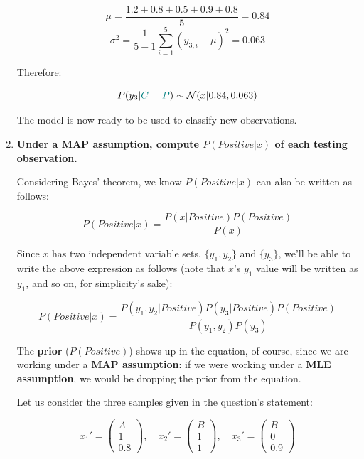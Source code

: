 \documentclass[12pt]{article}
\begin{document}
\begin{enumerate}[leftmargin=\labelsep]
\begin{multicols}{2}
          $$
            \mu = \frac{1.2 + 0.8 + 0.5 + 0.9 + 0.8}{5} = 0.84
          $$
          $$
            \sigma^2 = \frac{1}{5 - 1} \sum_{i = 1}^5 (y_{3, i} - \mu)^2 = 0.063
          $$

          Therefore:

          \vspace{-0.6cm}

          $$
            P(y_3 | \textcolor{teal}{C = P}) \sim \mathcal{N}(x | 0.84, 0.063)
          $$

        \end{multicols}

        The model is now ready to be used to classify new observations.

        \pagebreak

  \item \textbf{Under a MAP assumption, compute $P(Positive | x)$ of each testing observation.}

        Considering Bayes' theorem, we know $P(Positive | x)$ can also be written as follows:

        $$
          P(Positive | x) = \frac{P(x | Positive) P(Positive)}{P(x)}
        $$

        Since $x$ has two independent variable sets, $\{y_1, y_2\}$ and $\{y_3\}$, we'll be
        able to write the above expression as follows (note that $x$'s $y_1$ value will
        be written as $y_1$, and so on, for simplicity's sake):

        $$
          P(Positive | x) = \frac{P(y_1, y_2 | Positive) P(y_3 | Positive) P(Positive)}{P(y_1, y_2) P(y_3)}
        $$

        The \textbf{prior} ($P(Positive)$) shows up in the equation, of course, since
        we are working under a \textbf{MAP assumption}: if we were working under
        a \textbf{MLE assumption}, we would be dropping the prior from the equation.

        Let us consider the three samples given in the question's statement:

        $$
          x_1' = \begin{pmatrix}
            A \\
            1 \\
            0.8
          \end{pmatrix}, \quad
          x_2' = \begin{pmatrix}
            B \\
            1 \\
            1
          \end{pmatrix}, \quad
          x_3' = \begin{pmatrix}
            B \\
            0 \\
            0.9
          \end{pmatrix}
        $$


\end{enumerate}
\end{document}
